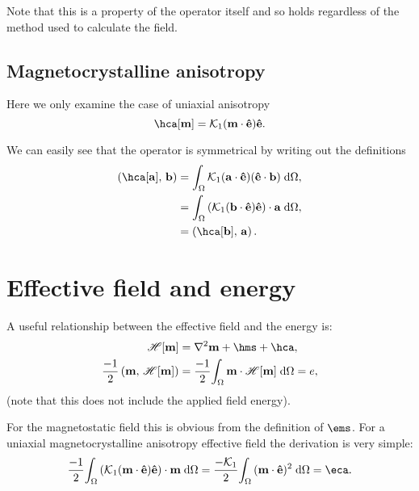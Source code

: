 Note that this is a property of the operator itself and so holds regardless of the method used to calculate the field.


\subsection{Magnetocrystalline anisotropy}

Here we only examine the case of uniaxial anisotropy
\begin{equation}
  \hca[\mv] = \kone (\mv \cdot \ev) \ev.
\end{equation}

We can easily see that the operator is symmetrical by writing out the definitions
\begin{equation}
  \begin{aligned}
    \ip{\hca[\av]}{\bv} &= \intd{ \kone (\av \cdot \ev) (\ev \cdot \bv)}, \\
    &= \intd{(\kone(\bv \cdot \ev) \ev) \cdot \av}, \\
    &= \ip{\hca[\bv]}{\av}.
  \end{aligned}
\end{equation}


\section{Effective field and energy}
\label{sec:energy-field-relation}

A useful relationship between the effective field and the energy is:
\begin{equation}
  \begin{aligned}
    \hop[\mv] &=  \lap \mv + \hms + \hca, \\
    \frac{-1}{2} \ip{\mv}{\hop[\mv]} &= \frac{-1}{2} \intd{\mv \cdot
      \hop[\mv]} = \e,
  \end{aligned}
\end{equation}
(note that this does not include the applied field energy).

For the magnetostatic field this is obvious from the definition of $\ems$.
For a uniaxial magnetocrystalline anisotropy effective field the derivation is very simple:
\begin{equation}
  \frac{-1}{2} \intd{\bigb{\kone (\mv \cdot \ev) \ev} \cdot \mv} =  \frac{-\kone}{2}\intd{(\mv \cdot \ev)^2} = \eca.
\end{equation}

